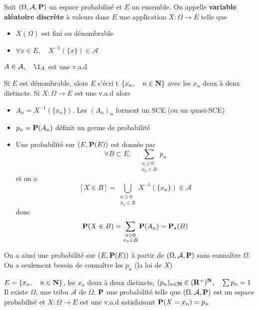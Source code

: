 \begin{dfn}
    Soit $(\Omega, \mathcal A, \P)$ un espace probabilisé et $E$ un ensemble. On appelle \textbf{variable aléatoire discrète} à valeurs dans $E$ une application $X:\Omega \to  E$ telle que \begin{itemize}
        \item $X(\Omega)$ est fini ou dénombrable
        \item  $ \forall x \in  E,\quad X^{-1}(\{x\} )\in  \mathcal A$
    \end{itemize}
\end{dfn}

\begin{ex}
    $A\in \mathcal A,\quad \1_A$ est une v.a.d
\end{ex}

\begin{rem}
    Si $E$ est dénombrable, alors $E$ s'écri t  $\{x_n,\quad n\in \N\} $ avec les $x_n$ deux à deux distincts. Si  $X:\Omega \to  E$ est une v.a.d alors \begin{itemize}
        \item $A_n=X^{-1}(\{x_n\} )$. Les $(A_n)_n$ forment un SCE (ou un quasi-SCE)
        \item $p_n=\P(A_n)$ définit un germe de probabilité
        \item Une probabilité sur $(E, \mathcal \P(E))$ est donnée par \[
                \forall B\subset E,\quad \sum_{\substack{n\geq 0\\ x_n\in  B}}p_n
        \] 
        et on a \[
            [X\in B]=\bigcup_{\substack{n\geq 0\\x_n\in  B}}X^{-1}(\{x_n\} )\in  \mathcal A 
        \] 
        donc \[
            \P(X\in  B)=\sum_{\substack{n\geq 0\\x_n\in B}}\P(A_n)=\P_\star (B)
        \] 
    \end{itemize}
    On a ainsi une probabilité sur $(E, \mathcal \P(E))$ à partir de $(\Omega, \mathcal A, \P)$ sans connaître $\Omega$. On a seulement besoin de connaître les $p_n$ (la loi de $X$)
\end{rem}

\begin{thm}
    \Hyp $E=\{x_n, \quad n\in \N\} $, les $x_n$ deux à deux distincts, $(p_n)_{n\in \N}\in (\R^+)^{\N}, \quad \sum p_n=1$
    \Conc Il existe $\Omega$, une tribu $\mathcal A$ de $\Omega$, $\P$ une probabilité telle que $(\Omega, \mathcal A,\P)$ est un espace probabilisé et $X:\Omega\to E$ est une v.a.d satisfaisant $\P(X=x_n)=p_n$
\end{thm}

